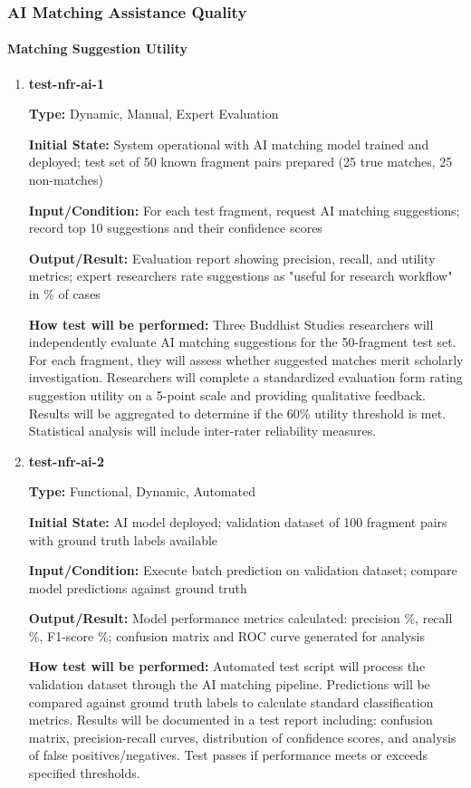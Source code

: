 \documentclass[12pt, titlepage]{article}
\begin{document}
\subsubsection{AI Matching Assistance Quality}

\paragraph{Matching Suggestion Utility}

\begin{enumerate}

\item \textbf{test-nfr-ai-1}

\textbf{Type:} Dynamic, Manual, Expert Evaluation
					
\textbf{Initial State:} System operational with AI matching model trained and deployed; test set of 50 known fragment pairs prepared (25 true matches, 25 non-matches)
					
\textbf{Input/Condition:} For each test fragment, request AI matching suggestions; record top 10 suggestions and their confidence scores
					
\textbf{Output/Result:} Evaluation report showing precision, recall, and utility metrics; expert researchers rate suggestions as "useful for research workflow" in \% of cases
					
\textbf{How test will be performed:} Three Buddhist Studies researchers will independently evaluate AI matching suggestions for the 50-fragment test set. For each fragment, they will assess whether suggested matches merit scholarly investigation. Researchers will complete a standardized evaluation form rating suggestion utility on a 5-point scale and providing qualitative feedback. Results will be aggregated to determine if the 60\% utility threshold is met. Statistical analysis will include inter-rater reliability measures.

\item \textbf{test-nfr-ai-2}

\textbf{Type:} Functional, Dynamic, Automated
					
\textbf{Initial State:} AI model deployed; validation dataset of 100 fragment pairs with ground truth labels available
					
\textbf{Input/Condition:} Execute batch prediction on validation dataset; compare model predictions against ground truth
					
\textbf{Output/Result:} Model performance metrics calculated: precision \%, recall \%, F1-score \%; confusion matrix and ROC curve generated for analysis
					
\textbf{How test will be performed:} Automated test script will process the validation dataset through the AI matching pipeline. Predictions will be compared against ground truth labels to calculate standard classification metrics. Results will be documented in a test report including: confusion matrix, precision-recall curves, distribution of confidence scores, and analysis of false positives/negatives. Test passes if performance meets or exceeds specified thresholds.

\end{enumerate}
\end{document}
